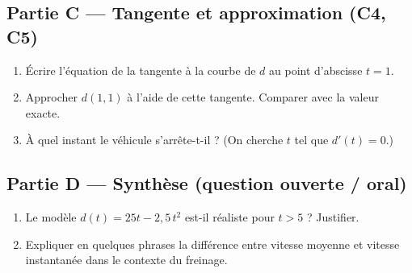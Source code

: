 
\subsection*{Partie C — Tangente et approximation (C4, C5)}

\begin{enumerate}[resume]
  \item Écrire l'équation de la tangente à la courbe de $d$ au point d'abscisse $t=1$.
  \item Approcher $d(1{,}1)$ à l'aide de cette tangente. Comparer avec la valeur exacte.
  \item À quel instant le véhicule s'arrête-t-il ? (On cherche $t$ tel que $d'(t) = 0$.)
\end{enumerate}


\subsection*{Partie D — Synthèse (question ouverte / oral)}

\begin{enumerate}[resume]
  \item Le modèle $d(t) = 25t - 2{,}5\,t^2$ est-il réaliste pour $t > 5$ ? Justifier.
  \item Expliquer en quelques phrases la différence entre vitesse moyenne et vitesse instantanée dans le contexte du freinage.
\end{enumerate}
